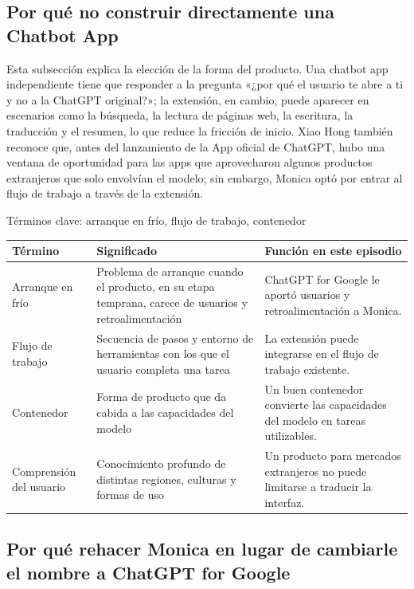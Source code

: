 \documentclass[a4paper]{article}
\begin{document}
\subsection{Por qué no construir directamente una Chatbot App}

Esta subsección explica la elección de la forma del producto. Una chatbot app independiente tiene que responder a la pregunta «¿por qué el usuario te abre a ti y no a la ChatGPT original?»; la extensión, en cambio, puede aparecer en escenarios como la búsqueda, la lectura de páginas web, la escritura, la traducción y el resumen, lo que reduce la fricción de inicio. Xiao Hong también reconoce que, antes del lanzamiento de la App oficial de ChatGPT, hubo una ventana de oportunidad para las apps que aprovecharon algunos productos extranjeros que solo envolvían el modelo; sin embargo, Monica optó por entrar al flujo de trabajo a través de la extensión.

\begin{knowledgebox}{Términos clave: arranque en frío, flujo de trabajo, contenedor}
\noindent\begin{tabularx}{\textwidth}{p{}p{}X}
\toprule
Término & Significado & Función en este episodio \\
\midrule
Arranque en frío & Problema de arranque cuando el producto, en su etapa temprana, carece de usuarios y retroalimentación & ChatGPT for Google le aportó usuarios y retroalimentación a Monica. \\
Flujo de trabajo & Secuencia de pasos y entorno de herramientas con los que el usuario completa una tarea & La extensión puede integrarse en el flujo de trabajo existente. \\
Contenedor & Forma de producto que da cabida a las capacidades del modelo & Un buen contenedor convierte las capacidades del modelo en tareas utilizables. \\
Comprensión del usuario & Conocimiento profundo de distintas regiones, culturas y formas de uso & Un producto para mercados extranjeros no puede limitarse a traducir la interfaz. \\
\bottomrule
\end{tabularx}
\end{knowledgebox}

\subsection{Por qué rehacer Monica en lugar de cambiarle el nombre a ChatGPT for Google}
\end{document}
